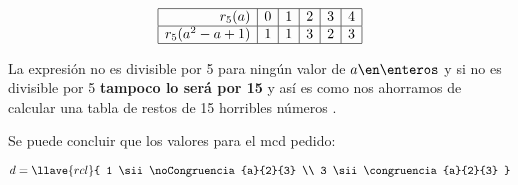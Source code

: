 $$
  \begin{array}{|r|c|c|c|c|c|}
    \hline
    r_5(a)            & 0 & 1 & 2 & 3 & 4 \\ \hline
    r_5(a^2 - a + 1 ) & 1 & 1 & 3 & 2 & 3 \\ \hline
  \end{array}
$$

La expresión no es divisible por 5 para ningún valor de $a \en \enteros$ y si no es divisible por 5 \textbf{tampoco lo será por 15} y así es como nos ahorramos
de calcular una tabla de restos de 15 horribles números .

Se puede concluir que los valores para el mcd pedido:

$$
  d =
  \llave{rcl}{
    1 \sii \noCongruencia{a}{2}{3} \\
    3 \sii \congruencia{a}{2}{3}
  }
$$

\begin{aportes}
  \item {}
\end{aportes}
